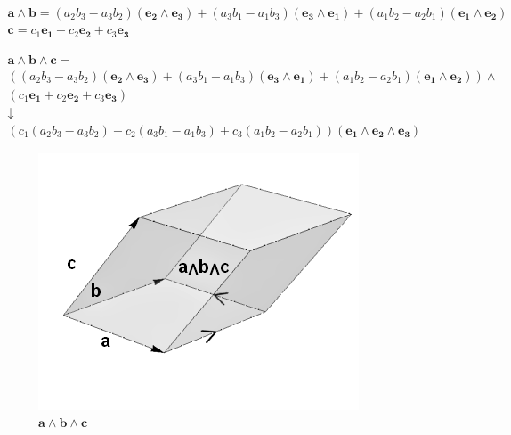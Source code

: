 \documentclass{amsart}
\begin{document}
			\begin{gather*}
				\mathbf{a} \wedge \mathbf{b} = (a_2 b_3 - a_3 b_2)(\mathbf{e_2} \wedge \mathbf{e_3}) + (a_3 b_1 - a_1 b_3)(\mathbf{e_3} \wedge \mathbf{e_1}) + (a_1 b_2 - a_2 b_1)(\mathbf{e_1} \wedge \mathbf{e_2})\\
				\mathbf{c} = c_1 \mathbf{e_1} + c_2 \mathbf{e_2} + c_3 \mathbf{e_3}
			\end{gather*}
			
			\begin{gather}
				\label{tri}
				\mathbf{a} \wedge \mathbf{b} \wedge \mathbf{c} =\\ \nonumber
				((a_2 b_3 - a_3 b_2)(\mathbf{e_2} \wedge \mathbf{e_3}) + (a_3 b_1 - a_1 b_3)(\mathbf{e_3} \wedge \mathbf{e_1}) + (a_1 b_2 - a_2 b_1)(\mathbf{e_1} \wedge \mathbf{e_2})) \wedge \\ \nonumber
				(c_1 \mathbf{e_1} + c_2 \mathbf{e_2} + c_3 \mathbf{e_3}) \\ \nonumber
				\downarrow \\ \nonumber
				(c_1(a_2 b_3 - a_3 b_2) + c_2(a_3 b_1 - a_1 b_3) + c_3(a_1 b_2 - a_2 b_1))(\mathbf{e_1} \wedge \mathbf{e_2} \wedge \mathbf{e_3}) \nonumber
			\end{gather}
		
		\begin{figure}
			\includegraphics[width=.5\linewidth]{Fall_2017_Math_Research_Paper_Visuals/Trivector}
			\caption{$\mathbf{a} \wedge \mathbf{b} \wedge \mathbf{c}$}
			\label{trivector}
		\end{figure}
	
\end{document}
